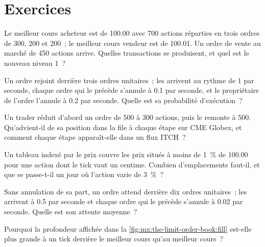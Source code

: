 \section{Exercices}

\begin{exercise}[$\star$]\label{exo:mx:the-limit-order-book:1}
Le meilleur cours acheteur est de 100.00 avec 700 actions réparties en trois ordres de 300, 200 et 200~; le meilleur cours vendeur est de 100.01. Un ordre de vente au marché de 450 actions arrive. Quelles transactions
se produisent, et quel est le nouveau niveau 1~?
\end{exercise}

\begin{exercise}[$\star$]\label{exo:mx:the-limit-order-book:2}
Un ordre rejoint derrière trois ordres unitaires~; les  arrivent au rythme de 1 par seconde, chaque ordre qui le précède s'annule à 0.1 par seconde, et le propriétaire de l'ordre
l'annule à 0.2 par seconde. Quelle est sa probabilité d'exécution~?
\end{exercise}

\begin{exercise}[$\star$]\label{exo:mx:the-limit-order-book:3}
Un trader réduit d'abord un ordre de 500 à 300 actions, puis le remonte à 500. Qu'advient-il de sa position dans la file à chaque étape sur CME Globex,
et comment chaque étape apparaît-elle dans un flux ITCH~?
\end{exercise}

\begin{exercise}[$\star\star$]\label{exo:mx:the-limit-order-book:4}
Un tableau indexé par le prix couvre les prix situés à moins de 1~\% de 100.00 pour une action dont le tick vaut un centime. Combien d'emplacements faut-il, et que se passe-t-il
un jour où l'action varie de 3~\%~?
\end{exercise}

\begin{exercise}[$\star\star$]\label{exo:mx:the-limit-order-book:5}
Sans annulation de sa part, un ordre attend derrière dix ordres unitaires~; les  arrivent à 0.5 par seconde et chaque ordre qui le précède s'annule à 0.02 par
seconde. Quelle est son attente moyenne~?
\end{exercise}

\begin{exercise}[$\star\star$]\label{exo:mx:the-limit-order-book:6}
Pourquoi la profondeur affichée dans la \cref{fig:mx:the-limit-order-book:fill} est-elle plus grande à un tick derrière le meilleur cours qu'au meilleur cours~?
\end{exercise}

